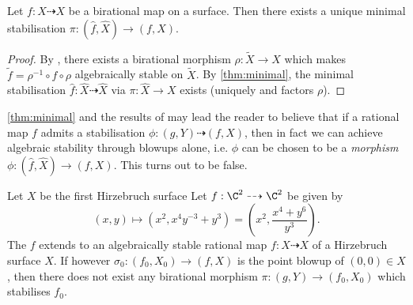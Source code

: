 \documentclass[11pt, final]{amsart}
\newcommand{\dashto}{\dashrightarrow}
\begin{document}
\begin{cor}\label{cor:minbirational}
 Let $f : X \dashto X$ be a birational map on a surface. Then there exists a unique minimal stabilisation $\pi : (\hat f, \hat X) \to (f, X)$.
 \end{cor}

\begin{proof}%
 By \cite{DF}, there exists a birational morphism $\rho : \tilde X \to X$ which makes $\tilde f = \rho^{-1} \circ f \circ \rho$ algebraically stable on $\tilde X$. By \autoref{thm:minimal}, the minimal stabilisation $\hat f : \hat X \dashto \hat X$ via $\pi : \hat X \to X$ exists (uniquely and factors $\rho$).
\end{proof}

\autoref{thm:minimal} and the results of \cite{Fav} may lead the reader to believe that if a rational map $f$ admits a stabilisation $\phi : (g, Y) \dashto (f, X)$, then in fact we can achieve algebraic stability through blowups alone, i.e. $\phi$ can be chosen to be a \emph{morphism} $\phi : (\hat f, \hat X) \to (f, X)$. %
This turns out to be false.




\begin{thm}\label{thm:counterex}
 Let $X$ be the first Hirzebruch surface
 Let $f : \C^2 \dashto \C^2$ be given by \[(x, y) \longmapsto (x^2, x^4y^{-3} + y^3) = \left(x^2, \frac{x^4 + y^6}{y^3}\right).\]
 The $f$ extends to an algebraically stable rational map $f : X \dashto X$ of a Hirzebruch surface $X$. 
 If however $\sigma_0 : (f_0, X_0) \to (f, X)$ is the point blowup of $(0, 0) \in X$, then there does not exist any birational morphism $\pi : (g, Y) \to (f_0, X_0)$ which stabilises $f_0$.
\end{thm}
\end{document}
